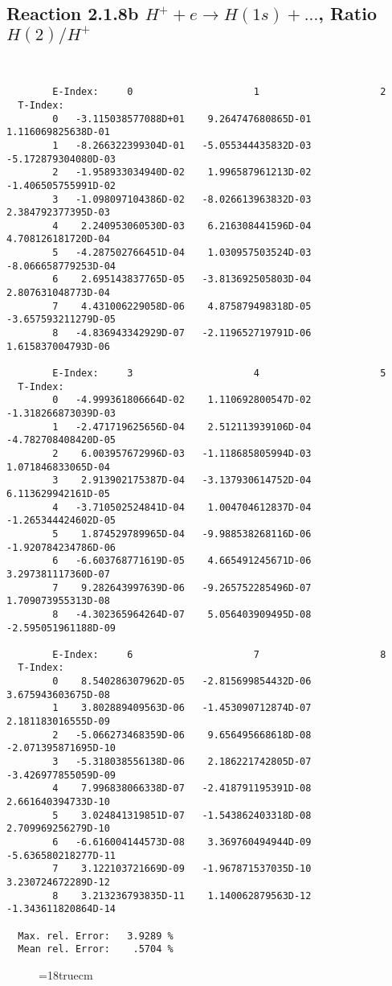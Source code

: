 \subsection{
Reaction 2.1.8b  $H^+ + e \rightarrow H(1s) + ...$,  Ratio $H(2)/H^+$
}

\begin{verbatim}


        E-Index:     0                     1                     2
  T-Index:
        0   -3.115038577088D+01    9.264747680865D-01    1.116069825638D-01
        1   -8.266322399304D-01   -5.055344435832D-03   -5.172879304080D-03
        2   -1.958933034940D-02    1.996587961213D-02   -1.406505755991D-02
        3   -1.098097104386D-02   -8.026613963832D-03    2.384792377395D-03
        4    2.240953060530D-03    6.216308441596D-04    4.708126181720D-04
        5   -4.287502766451D-04    1.030957503524D-03   -8.066658779253D-04
        6    2.695143837765D-05   -3.813692505803D-04    2.807631048773D-04
        7    4.431006229058D-06    4.875879498318D-05   -3.657593211279D-05
        8   -4.836943342929D-07   -2.119652719791D-06    1.615837004793D-06

        E-Index:     3                     4                     5
  T-Index:
        0   -4.999361806664D-02    1.110692800547D-02   -1.318266873039D-03
        1   -2.471719625656D-04    2.512113939106D-04   -4.782708408420D-05
        2    6.003957672996D-03   -1.118685805994D-03    1.071846833065D-04
        3    2.913902175387D-04   -3.137930614752D-04    6.113629942161D-05
        4   -3.710502524841D-04    1.004704612837D-04   -1.265344424602D-05
        5    1.874529789965D-04   -9.988538268116D-06   -1.920784234786D-06
        6   -6.603768771619D-05    4.665491245671D-06    3.297381117360D-07
        7    9.282643997639D-06   -9.265752285496D-07    1.709073955313D-08
        8   -4.302365964264D-07    5.056403909495D-08   -2.595051961188D-09

        E-Index:     6                     7                     8
  T-Index:
        0    8.540286307962D-05   -2.815699854432D-06    3.675943603675D-08
        1    3.802889409563D-06   -1.453090712874D-07    2.181183016555D-09
        2   -5.066273468359D-06    9.656495668618D-08   -2.071395871695D-10
        3   -5.318038556138D-06    2.186221742805D-07   -3.426977855059D-09
        4    7.996838066338D-07   -2.418791195391D-08    2.661640394733D-10
        5    3.024841319851D-07   -1.543862403318D-08    2.709969256279D-10
        6   -6.616004144573D-08    3.369760494944D-09   -5.636580218277D-11
        7    3.122103721669D-09   -1.967871537035D-10    3.230724672289D-12
        8    3.213236793835D-11    1.140062879563D-12   -1.343611820864D-14

  Max. rel. Error:   3.9289 %
  Mean rel. Error:    .5704 %

\end{verbatim}
\begin{figure} \label{2.1.8rb}
\epsfxsize=18truecm
\end{figure}
\newpage




